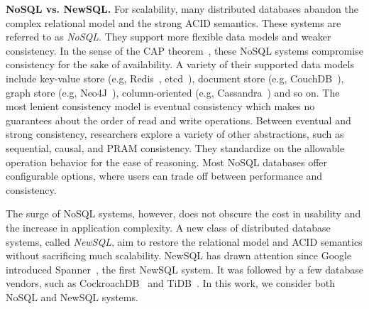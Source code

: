 \textbf{NoSQL vs. NewSQL.}
For scalability, many distributed databases abandon the complex relational model
and the strong ACID semantics.
These systems are referred to as {\em NoSQL}. They support more flexible data
models and weaker consistency.
In the sense of the CAP theorem~\cite{gilbert2012perspectives}, these NoSQL
systems compromise consistency for the sake of availability.
A variety of their supported data models include key-value store (e.g,
Redis~\cite{carlson2013redis}, etcd~\cite{web:etcd}), document store (e.g,
CouchDB~\cite{anderson2010couchdb}), graph store (e.g,
Neo4J~\cite{vukotic2014neo4j}), column-oriented (e.g,
Cassandra~\cite{lakshman2010cassandra}) and so on.
The most lenient consistency model is eventual consistency which makes no
guarantees about the order of read and write operations.
Between eventual and strong consistency, researchers explore a variety of other
abstractions, such as sequential, causal, and PRAM consistency. They standardize
on the allowable operation behavior for the ease of reasoning.
Most NoSQL databases offer configurable options, where users can trade off
between performance and consistency.

The surge of NoSQL systems, however, does not obscure the cost in usability and
the increase in application complexity.  A new class of distributed database
systems, called {\em NewSQL}, aim to restore the relational model and ACID
semantics without sacrificing much scalability.
NewSQL has drawn attention since Google introduced
Spanner~\cite{corbett2013spanner}, the first NewSQL system. It was followed by a
few database vendors, such as CockroachDB~\cite{web:cockroach} and
TiDB~\cite{web:tidb}. In this work, we consider both NoSQL and NewSQL systems.

